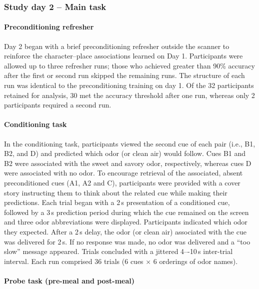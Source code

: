 \documentclass[12pt,letterpaper]{article}
\begin{document}
\subsubsection*{Study day 2 – Main task}



\paragraph*{Preconditioning refresher}

Day 2 began with a brief preconditioning refresher outside the scanner to reinforce the character–place associations learned on Day 1. Participants were allowed up to three refresher runs; those who achieved greater than 90\% accuracy after the first or second run skipped the remaining runs. The structure of each run was identical to the preconditioning training on day 1. Of the 32 participants retained for analysis, 30 met the accuracy threshold after one run, whereas only 2 participants required a second run.


\paragraph*{Conditioning task}

In the conditioning task, participants viewed the second cue of each pair (i.e., B1, B2, and D) and predicted which odor (or clean air) would follow. Cues B1 and B2 were associated with the sweet and savory odor, respectively, whereas cues D were associated with no odor. To encourage retrieval of the associated, absent preconditioned cues (A1, A2 and C), participants were provided with a cover story instructing them to think about the related cue while making their predictions. Each trial began with a 2\,s presentation of a conditioned cue, followed by a 3\,s prediction period during which the cue remained on the screen and three odor abbreviations were displayed. Participants indicated which odor they expected. After a 2\,s delay, the odor (or clean air) associated with the cue was delivered for 2\,s. If no response was made, no odor was delivered and a “too slow” message appeared. Trials concluded with a jittered 4–-10\,s inter-trial interval. Each run comprised 36 trials (6 cues $\times$ 6 orderings of odor names). 


\paragraph*{Probe task (pre-meal and post-meal)}
\end{document}
